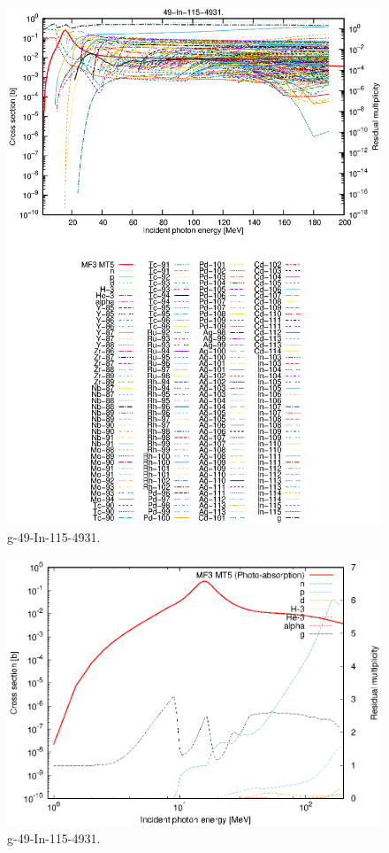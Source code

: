 \begin{figure}
 \includegraphics[width=\linewidth]{eps/g_49-In-115_4931.eps}
  \caption{g-49-In-115-4931.}
\end{figure}
\newpage \clearpage

\begin{figure}
 \includegraphics[width=\linewidth]{eps-log/g_49-In-115_4931.eps}
 \caption{g-49-In-115-4931.}
\end{figure}
\newpage \clearpage

